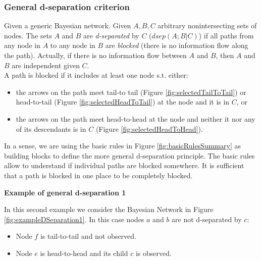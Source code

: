 \subsubsection{General d-separation criterion}
Given a generic Bayesian network. Given $A,B,C$ arbitrary nonintersecting sets
of nodes. The sets $A$ and $B$ are \textit{d-separated} by $C$ ($\mathit{dsep}(A;
B|C)$) if all paths from any node in $A$ to any node in $B$ are \textit{blocked}
(there is no information flow along the path). Actually, if there is no information
flow between $A$ and $B$, then $A$ and $B$ are independent given $C$.\\ A path
is blocked if it includes at least one node s.t. either:
\begin{itemize}
	\item the arrows on the path meet tail-to tail (Figure
		\ref{fig:selectedTailToTail}) or head-to-tail (Figure
		\ref{fig:selectedHeadToTail}) at the node and it is in $C$, or

	\item the arrows on the path meet head-to-head at the node and neither it nor any
		of its descendants is in $C$ (Figure \ref{fig:selectedHeadToHead}).
\end{itemize}


In a sense, we are using the basic rules in Figure \ref{fig:basicRulesSummary}
as building blocks to define the more general d-separation principle. The basic rules
allow to understand if individual paths are blocked somewhere. It is sufficient
that a path is blocked in one place to be completely blocked.
\newline

\textbf{Example of general d-separation 1}

In this second example we consider the Bayesian Network in Figure
\ref{fig:exampleDSeparation1}. In this case nodes $a$ and $b$ are not d-separated
by $c$:
\begin{itemize}
	\item Node $f$ is tail-to-tail and not observed.

	\item Node $e$ is head-to-head and its child $c$ is observed.
\end{itemize}

